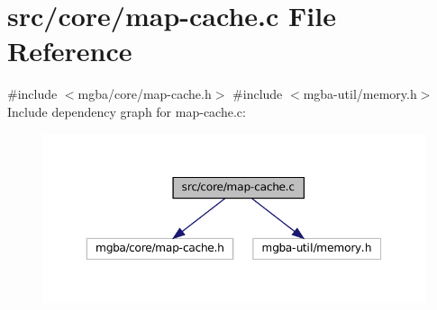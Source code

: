 \hypertarget{map-cache_8c}{}\section{src/core/map-\/cache.c File Reference}
\label{map-cache_8c}
{\ttfamily \#include $<$mgba/core/map-\/cache.\+h$>$}\newline
{\ttfamily \#include $<$mgba-\/util/memory.\+h$>$}\newline
Include dependency graph for map-\/cache.c\+:
\nopagebreak
\begin{figure}[H]
\begin{center}
\leavevmode
\includegraphics[width=350pt]{map-cache_8c__incl}
\end{center}
\end{figure}

